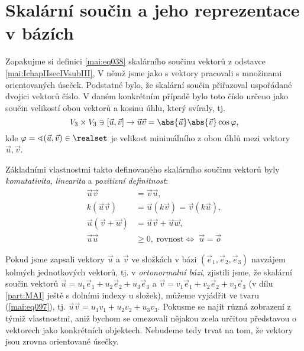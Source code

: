   \section{Skalární součin a jeho reprezentace v bázích}\label{mai:IIchapIIIsecII}
    Zopakujme si definici \ref{mai:eq038} skalárního součinu vektorů z odstavce
    \ref{mai:IchapIIsecIVsubIII},  V němž jsme jako s vektory pracovali s množinami orientovaných
    úseček. Podstatné bylo, že skalární součin přiřazoval uspořádané dvojici vektorů číslo. V
    daném konkrétním případě bylo toto číslo určeno jako součin velikostí obou vektorů a kosinu
    úhlu, který svíraly, tj.
    \begin{equation*}
      V_3\times V_3\ni[\vec{u},\vec{v}]
        \rightarrow\vec{u}\vec{v} = \abs{\vec{u}}\abs{\vec{v}}\cos\varphi,
    \end{equation*} 
    kde \(\varphi = \sphericalangle(\vec{u},\vec{v})\in\realset\) je velikost minimálního z obou
    úhlů mezi vektory\(\vec{u},\vec{v}\).

    Základními vlastnostmi takto definovaného skalárního součinu vektorů byly \emph{komutativita},
    \emph{linearita} a \emph{pozitivní definitnost}: 
    \begin{subequations}\label{mai:eq095}
      \begin{align}
        \vec{u}\vec{v}    &= \vec{v}\vec{u},                                   \label{mai:eq095a} \\
        k(\vec{u}\vec{v}) &= \vec{u}(k\vec{v}) = \vec{v}(k\vec{u}),            \label{mai:eq095b} \\
        \vec{u}(\vec{v} + \vec{w}) &= \vec{u}\vec{v} + \vec{u}\vec{w},         \label{mai:eq095c} \\
        \vec{u}\vec{u}&\geq 0,\;\text{rovnost}\Leftrightarrow\;\vec{u}=\vec{o} \label{mai:eq095d}        
      \end{align}
    \end{subequations}

    Pokud jsme zapsali vektory  \(\vec{u}\) a \(\vec{v}\) ve složkách v bázi \((\vec{e}_1,
    \vec{e}_2, \vec{e}_3)\) navzájem kolmých jednotkových vektorů, tj. v \emph{ortonormalní bázi},
    zjistili jsme, že skalární součin vektorů  \(\vec{u} = u_1\vec{e}_1 + u_2\vec{e}_2 +
    u_3\vec{e}_3\) a  \(\vec{v} = v_1\vec{e}_1 + v_2\vec{e}_2 + v_3\vec{e}_3\) (v dílu
    \ref{part:MAI} ještě s dolními indexy u složek), můžeme vyjádřit ve tvaru (\ref{mai:eq097}), tj.
    \(\vec{u}\vec{v} = u_1v_1 + u_2v_2 + u_3v_3\). Pokusme se najít různá zobrazení z týmiž
    vlastnostmi, aniž bychom se omezovali nějakou zcela určitou představou o vektorech jako
    konkrétních objektech. Nebudeme tedy trvat na tom, že vektory jsou zrovna orientované úsečky. 


